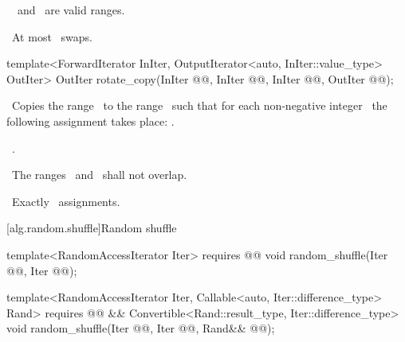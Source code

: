 \documentclass[american,twoside]{book}
\begin{document}
\begin{paras}
\begin{itemdescr}
\pnum
\requires\ 
\
and
\
are valid ranges.

\pnum
\complexity\ 
At most
\
swaps.
\end{itemdescr}

%
\color{addclr}\begin{itemdecl}
template<ForwardIterator InIter, OutputIterator<auto, InIter::value_type> OutIter>
  OutIter rotate_copy(InIter @@, InIter @@,
                      InIter @@, OutIter @@);
\end{itemdecl}\color{black}

\begin{itemdescr}
\pnum
\effects\ 
Copies the range
\
to the range
\
such that for each non-negative integer
\
the following assignment takes place:
.

\pnum
\returns\ 
.

\pnum
\requires\ 
The ranges
\range{\farg{first}}{\farg{last}}\
and
\
shall not overlap.

\pnum
\complexity\ 
Exactly
\
assignments.
\end{itemdescr}

\rSec2[alg.random.shuffle]{Random shuffle}

%
\color{addclr}\begin{itemdecl}
template<RandomAccessIterator Iter>
  requires @@
  void random_shuffle(Iter @@,
                      Iter @@);

template<RandomAccessIterator Iter, Callable<auto, Iter::difference_type> Rand>
  requires @@
        && Convertible<Rand::result_type, Iter::difference_type>
  void random_shuffle(Iter @@,
                      Iter @@,
                      Rand&& @@);


\end{itemdecl}
\end{paras}
\end{document}
